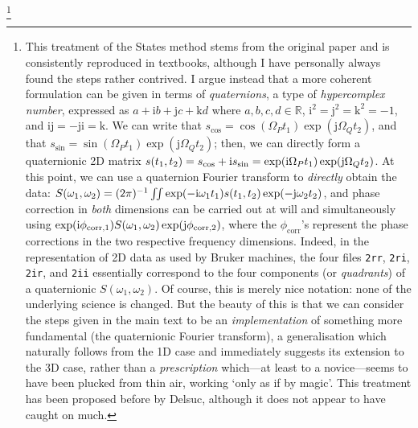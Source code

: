 \footnote{This treatment of the States method stems from the original paper\autocite{States1982JMR} and is consistently reproduced in textbooks, although I have personally always found the steps rather contrived.
    I argue instead that a more coherent formulation can be given in terms of \textit{quaternions}, a type of \textit{hypercomplex number}, expressed as $a + \mathrm{i}b + \mathrm{j}c + \mathrm{k}d$ where $a, b, c, d \in \mathbb{R}$, $\mathrm{i}^2 = \mathrm{j}^2 = \mathrm{k}^2 = -1$, and $\mathrm{ij = -ji = k}$.
    We can write that $s_\text{cos} = \cos(\Omega_P t_1)\exp(\mathrm{j}\Omega_Q t_2)$, and that $s_\text{sin} = \sin(\Omega_P t_1)\exp(\mathrm{j}\Omega_Q t_2)$; then, we can directly form a quaternionic 2D matrix $s(t_1, t_2) = s_\text{cos} + \mathrm{i} s_\text{sin} = \exp(\mathrm{i}\Omega_P t_1)\exp(\mathrm{j}\Omega_Q t_2)$.
    At this point, we can use a quaternion Fourier transform to \textit{directly} obtain the data: $S(\omega_1, \omega_2) = (2\pi)^{-1}\iint \exp(-\mathrm{i}\omega_1 t_1)s(t_1, t_2) \exp(-\mathrm{j}\omega_2 t_2)$, and phase correction in \textit{both} dimensions can be carried out at will and simultaneously using
    $\exp(\mathrm{i} \phi_\text{corr,1})S(\omega_1, \omega_2) \exp(\mathrm{j}\phi_\text{corr,2})$, where the $\phi_\text{corr}$'s represent the phase corrections in the two respective frequency dimensions.
    Indeed, in the representation of 2D data as used by Bruker machines, the four files \texttt{2rr}, \texttt{2ri}, \texttt{2ir}, and \texttt{2ii} essentially correspond to the four components (or \textit{quadrants}) of a quaternionic $S(\omega_1, \omega_2)$.
    Of course, this is merely nice notation: none of the underlying science is changed.
    But the beauty of this is that we can consider the steps given in the main text to be an \textit{implementation} of something more fundamental (the quaternionic Fourier transform), a generalisation which naturally follows from the 1D case and immediately suggests its extension to the 3D case, rather than a \textit{prescription} which---at least to a novice---seems to have been plucked from thin air, working `only as if by magic'.
    This treatment has been proposed before by Delsuc\autocite{Delsuc1988JMR}, although it does not appear to have caught on much.
}

